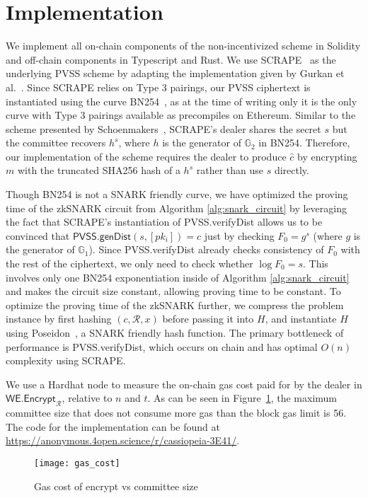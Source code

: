 \section{Implementation}

We implement all on-chain components of the non-incentivized scheme in Solidity and off-chain components in Typescript and Rust.
We use SCRAPE~\cite{pvss_scrape} as the underlying PVSS scheme by adapting the implementation given by Gurkan et al.~\cite{aggregatable_dkg}.
Since SCRAPE relies on Type 3 pairings, our PVSS ciphertext is instantiated using the curve BN254~\cite{bn254}, as at the time of writing only it is the only curve with Type 3 pairings available as precompiles on Ethereum.
Similar to the scheme presented by Schoenmakers~\cite{pvss_schoenmakers}, SCRAPE's dealer shares the secret $s$ but the committee recovers $h^s$, where $h$ is the generator of $\mathbb{G}_2$ in BN254.
Therefore, our implementation of the scheme requires the dealer to produce $\hat{c}$ by encrypting $m$ with the truncated SHA256 hash of a $h^s$ rather than use $s$ directly.

Though BN254 is not a SNARK friendly curve, we have optimized the proving time of the zkSNARK circuit from Algorithm \ref{alg:snark_circuit} by leveraging the fact that SCRAPE's instantiation of \textsf{PVSS.verifyDist} allows us to be convinced that $\textsf{PVSS.genDist}(s, [pk_i]) = c$ just by checking $F_0 = g^s$ (where $g$ is the generator of $\mathbb{G}_1$).
Since \textsf{PVSS.verifyDist} already checks consistency of $F_0$ with the rest of the ciphertext, we only need to check whether $\log F_0 = s$.
This involves only one BN254 exponentiation inside of Algorithm \ref{alg:snark_circuit} and makes the circuit size constant, allowing proving time to be constant.
To optimize the proving time of the zkSNARK further, we compress the problem instance by first hashing $(c, \mathcal{R}, x)$ before passing it into $H$, and instantiate $H$ using Poseidon~\cite{poseidon}, a SNARK friendly hash function.
The primary bottleneck of performance is \textsf{PVSS.verifyDist}, which occurs on chain and has optimal $O(n)$ complexity using SCRAPE.


We use a Hardhat node to measure the on-chain gas cost paid for by the dealer in $\textsf{WE.Encrypt}_\mathcal{R}$, relative to $n$ and $t$.
As can be seen in Figure~\ref{fig:gas_cost}, the maximum committee size that does not consume more gas than the block gas limit is 56. 
The code for the implementation can be found at \url{https://anonymous.4open.science/r/cassiopeia-3E41/}.
\begin{figure}\label{fig:gas_cost}
\caption{Gas cost of \textsf{encrypt} vs committee size}
\texttt{[image: gas\_cost]}
\end{figure}


